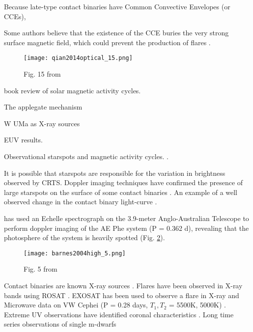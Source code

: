 \documentclass[12pt]{article} %
\numberwithin{equation}{section} %
\begin{document}
 Because late-type contact binaries have Common Convective Envelopes (or CCEs), 

Some authors believe that the existence of the CCE buries the very strong surface magnetic field, which could prevent the production of flares \citep{qian2014optical}. 

\begin{figure}[H]
\centering
\texttt{[image: qian2014optical\_15.png]}
\caption{Fig. 15 from \citet{qian2014optical}}
\label{fig: qian2014optical_15}
\end{figure}

\citep{balogh2015solar} book review of solar magnetic activity cycles.

The applegate mechanism \citep{applegate1992mechanism} \citep{lanza2006internal}

W UMa as X-ray sources \citep{stepien2001rosat}

\citep{rucinski1998extreme} EUV results.

Observational starspots and magnetic activity cycles.  \citep{borkovits2005indirect,qian2000possible,kaszas1998period,qian2007ad,lee2004period,yang2012deep,zhang2004long}.

It is possible that starspots are responsible for the variation in brightness observed by CRTS. Doppler imaging techniques have confirmed the presence of large starspots on the surface of some contact binaries \citep{barnes2004high}.  An example of a well observed change in the contact binary light-curve \citep{gazeas2006modeling}.

\citet{barnes2004high} has used an Echelle spectrograph on the 3.9-meter Anglo-Australian Telescope to perform doppler imaging of the AE Phe system (P = 0.362 d), revealing that the photosphere of the system is heavily spotted (Fig. \ref{fig: barnes2004high_5}).

\begin{figure}[H]
\centering
\texttt{[image: barnes2004high\_5.png]}
\caption{Fig. 5 from \citet{barnes2004high}}
\label{fig: barnes2004high_5}
\end{figure}

Contact binaries are known X-ray sources \citep{chen2006w}. Flares have been observed in X-ray bands using ROSAT \citep{mcgale1996rosat}.
EXOSAT has been used to observe a flare in X-ray and Microwave data on VW Cephei (P =  0.28 days, $T_{1}, T_{2}$ = 5500K, 5000K) \citep{vilhu1988simultaneous}. Extreme UV observations have identified coronal characteristics \citep{brickhouse1998extreme}. Long time series observations of single m-dwarfs  \citep{lacy1976uv}
\end{document}
